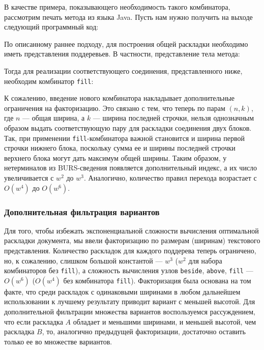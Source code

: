 В качестве примера, показывающего необходимость такого комбинатора, рассмотрим
печать метода из языка Java. Пусть нам нужно получить на выходе следующий программный
код:



По описанному раннее подходу, для построения общей раскладки необходимо иметь представления
поддеревьев. В частности, представление тела метода:



Тогда для реализации соответствующего соединения, представленного ниже,
необходим комбинатор \lstinline{fill}:



К сожалению, введение нового комбинатора накладывает дополнительные ограничения на
факторизацию. Это связано с тем, что теперь по парам $(n, k)$, где $n$ --- общая ширина,
а $k$ --- ширина последней строчки, нельзя однозначным образом выдать соответствующую
пару для раскладки соединения двух блоков. Так, при применении \lstinline{fill}-комбинатора
важной становится и ширина первой строчки нижнего блока, поскольку сумма ее и ширины
последней строчки верхнего блока могут дать максимум общей ширины. Таким образом,
у нетерминалов из BURS-сведения появляется дополнительный индекс, а их число
увеличивается с $w^2$ до $w^3$. Аналогично, количество правил перехода возрастает
с $O(w^4)$ до $O(w^6)$.

\subsubsection{Дополнительная фильтрация вариантов}

Для того, чтобы избежать экспоненциальной сложности вычисления оптимальной
раскладки документа, мы ввели факторизацию по размерам (ширинам) текстового
представления.
Количество раскладок для каждого поддерева теперь ограничено, но, к сожалению,
слишком большой константой --- $w^3$ ($w^2$ для набора комбинаторов без
\lstinline{fill}), а сложность вычисления узлов
\lstinline{beside}, \lstinline{above}, \lstinline{fill} --- $O(w^6)$
($O(w^4)$ без комбинатора \lstinline{fill}). Факторизация была основана на том факте, что
среди раскладок с одинаковыми ширинами в любом дальнейшем использовании
к лучшему результату приводит вариант с меньшей высотой.
Для дополнительной фильтрации множества
вариантов воспользуемся рассуждением, что если раскладка $A$ обладает и
меньшими ширинами, и меньшей высотой, чем раскладка $B$, то, аналогично
предыдущей факторизации,
достаточно оставить только ее во множестве вариантов.

